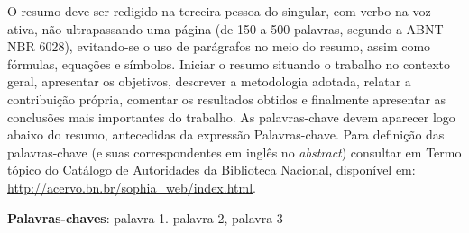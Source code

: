 
\begin{resumo}%

    
    O resumo deve ser redigido na terceira pessoa do singular, com verbo na voz ativa, não ultrapassando uma página (de 150 a 500 palavras, segundo a ABNT NBR 6028), evitando-se o uso de parágrafos no meio do resumo, assim como fórmulas, equações e símbolos. Iniciar o resumo situando o trabalho no contexto geral, apresentar os objetivos, descrever a metodologia adotada, relatar a contribuição própria, comentar os resultados obtidos e finalmente apresentar as conclusões mais importantes do trabalho. As palavras-chave devem aparecer logo abaixo do resumo, antecedidas da expressão Palavras-chave. Para definição das palavras-chave (e suas correspondentes em inglês no \textit{abstract}) consultar em Termo tópico do Catálogo de Autoridades da Biblioteca Nacional, disponível em: \url{http://acervo.bn.br/sophia_web/index.html}.

    \noindent
    \textbf{Palavras-chaves}: palavra 1. palavra 2, palavra 3

\end{resumo}
    